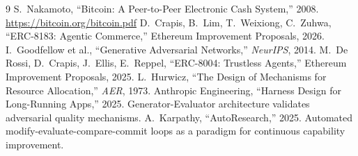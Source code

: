 \documentclass[11pt,a4paper]{article}
\begin{document}
\begin{thebibliography}{9}
 S.~Nakamoto, ``Bitcoin: A Peer-to-Peer Electronic Cash System,'' 2008. \url{https://bitcoin.org/bitcoin.pdf}
 D.~Crapis, B.~Lim, T.~Weixiong, C.~Zuhwa, ``ERC-8183: Agentic Commerce,'' Ethereum Improvement Proposals, 2026.
 I.~Goodfellow et al., ``Generative Adversarial Networks,'' \emph{NeurIPS}, 2014.
 M.~De Rossi, D.~Crapis, J.~Ellis, E.~Reppel, ``ERC-8004: Trustless Agents,'' Ethereum Improvement Proposals, 2025.
 L.~Hurwicz, ``The Design of Mechanisms for Resource Allocation,'' \emph{AER}, 1973.
 Anthropic Engineering, ``Harness Design for Long-Running Apps,'' 2025. Generator-Evaluator architecture validates adversarial quality mechanisms.
 A.~Karpathy, ``AutoResearch,'' 2025. Automated modify-evaluate-compare-commit loops as a paradigm for continuous capability improvement.
\end{thebibliography}
\end{document}
